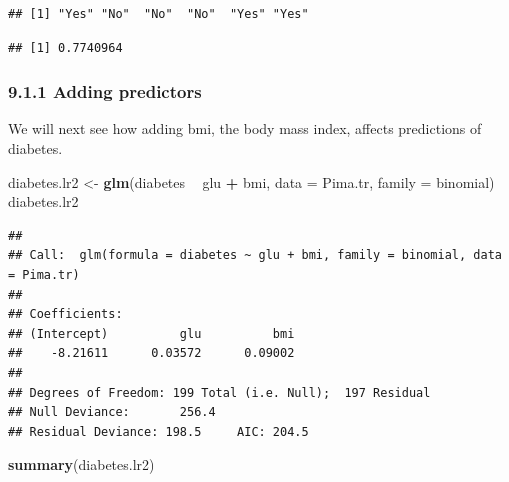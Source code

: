 \documentclass[]{article}
\newenvironment{Shaded}{\begin{snugshade}}{\end{snugshade}}
\newcommand{\KeywordTok}[1]{\textcolor[rgb]{0.13,0.29,0.53}{\textbf{#1}}}
\newcommand{\DataTypeTok}[1]{\textcolor[rgb]{0.13,0.29,0.53}{#1}}
\newcommand{\DecValTok}[1]{\textcolor[rgb]{0.00,0.00,0.81}{#1}}
\newcommand{\StringTok}[1]{\textcolor[rgb]{0.31,0.60,0.02}{#1}}
\newcommand{\OperatorTok}[1]{\textcolor[rgb]{0.81,0.36,0.00}{\textbf{#1}}}
\newcommand{\NormalTok}[1]{#1}
\begin{document}
\begin{verbatim}
## [1] "Yes" "No"  "No"  "No"  "Yes" "Yes"
\end{verbatim}

\begin{Shaded}
\end{Shaded}

\begin{verbatim}
## [1] 0.7740964
\end{verbatim}

\subsubsection{9.1.1 Adding predictors}\label{adding-predictors}

We will next see how adding bmi, the body mass index, affects
predictions of diabetes.

\begin{Shaded}
\begin{Highlighting}[]
\NormalTok{diabetes.lr2 <-}\StringTok{ }\KeywordTok{glm}\NormalTok{(diabetes }\OperatorTok{~}\StringTok{ }\NormalTok{glu }\OperatorTok{+}\StringTok{ }\NormalTok{bmi, }\DataTypeTok{data =}\NormalTok{ Pima.tr, }\DataTypeTok{family =}\NormalTok{ binomial)}
\NormalTok{diabetes.lr2}
\end{Highlighting}
\end{Shaded}

\begin{verbatim}
## 
## Call:  glm(formula = diabetes ~ glu + bmi, family = binomial, data = Pima.tr)
## 
## Coefficients:
## (Intercept)          glu          bmi  
##    -8.21611      0.03572      0.09002  
## 
## Degrees of Freedom: 199 Total (i.e. Null);  197 Residual
## Null Deviance:       256.4 
## Residual Deviance: 198.5     AIC: 204.5
\end{verbatim}

\begin{Shaded}
\begin{Highlighting}[]
\KeywordTok{summary}\NormalTok{(diabetes.lr2)}
\end{Highlighting}
\end{Shaded}
\end{document}
